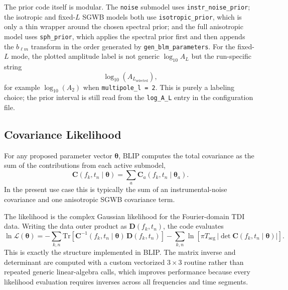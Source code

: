 \documentclass[11pt]{article}
\begin{document}
The prior code itself is modular. The \texttt{noise} submodel uses \texttt{instr\_noise\_prior}; the isotropic and fixed-$L$ SGWB models both use \texttt{isotropic\_prior}, which is only a thin wrapper around the chosen spectral prior; and the full anisotropic model uses \texttt{sph\_prior}, which applies the spectral prior first and then appends the $b_{\ell m}$ transform in the order generated by \texttt{gen\_blm\_parameters}. For the fixed-$L$ mode, the plotted amplitude label is not generic $\log_{10}A_L$ but the run-specific string
\begin{equation}
\log_{10}(A_{L_{\mathrm{selected}}}),
\end{equation}
for example $\log_{10}(A_2)$ when \texttt{multipole\_l = 2}. This is purely a labeling choice; the prior interval is still read from the \texttt{log\_A\_L} entry in the configuration file.

\subsection{Covariance Likelihood}
For any proposed parameter vector $\bm{\theta}$, BLIP computes the total covariance as the sum of the contributions from each active submodel,
\begin{equation}
\mathbf{C}(f_k,t_n\mid\bm{\theta})
=\sum_a \mathbf{C}_a(f_k,t_n\mid\bm{\theta}_a).
\end{equation}
In the present use case this is typically the sum of an instrumental-noise covariance and one anisotropic SGWB covariance term.

The likelihood is the complex Gaussian likelihood for the Fourier-domain TDI data. Writing the data outer product as $\mathbf{D}(f_k,t_n)$, the code evaluates
\begin{equation}
\ln \mathcal{L}(\bm{\theta})
=-\sum_{k,n}\mathrm{Tr}\!\left[
\mathbf{C}^{-1}(f_k,t_n\mid\bm{\theta})\,
\mathbf{D}(f_k,t_n)
\right]
-\sum_{k,n}\ln\!\left[
\pi T_{\mathrm{seg}}\,
\left|\det \mathbf{C}(f_k,t_n\mid\bm{\theta})\right|
\right].
\label{eq:likelihood}
\end{equation}
This is exactly the structure implemented in BLIP. The matrix inverse and determinant are computed with a custom vectorized $3\times3$ routine rather than repeated generic linear-algebra calls, which improves performance because every likelihood evaluation requires inverses across all frequencies and time segments.
\end{document}

